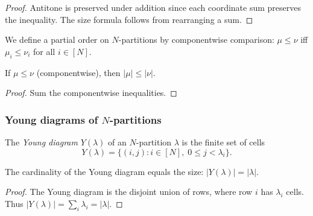 \begin{proof}
\leanok
Antitone is preserved under addition since each coordinate sum preserves the inequality.
The size formula follows from rearranging a sum.
\end{proof}

\begin{definition}
\label{def.sf.Npar-order}
\leanhelper
\leanok
We define a partial order on $N$-partitions by componentwise comparison:
$\mu \leq \nu$ iff $\mu_i \leq \nu_i$ for all $i \in [N]$.
\end{definition}

\begin{lemma}
\label{lem.sf.Npar-le-size}
\leanhelper
\leanok
If $\mu \leq \nu$ (componentwise), then $|\mu| \leq |\nu|$.
\end{lemma}

\begin{proof}
\leanok
Sum the componentwise inequalities.
\end{proof}

\subsubsection{Young diagrams of $N$-partitions}

\begin{definition}
\label{def.sf.Npar-youngDiagram}
\leanhelper
\leanok
The \emph{Young diagram} $Y(\lambda)$ of an $N$-partition $\lambda$
is the finite set of cells
\[
Y(\lambda) = \{(i, j) : i \in [N],\; 0 \leq j < \lambda_i\}.
\]
\end{definition}

\begin{lemma}
\label{lem.sf.Npar-youngDiagram-card}
\leanhelper
\leanok
The cardinality of the Young diagram equals the size:
$|Y(\lambda)| = |\lambda|$.
\end{lemma}

\begin{proof}
\leanok
The Young diagram is the disjoint union of rows, where row $i$ has $\lambda_i$ cells.
Thus $|Y(\lambda)| = \sum_i \lambda_i = |\lambda|$.
\end{proof}

